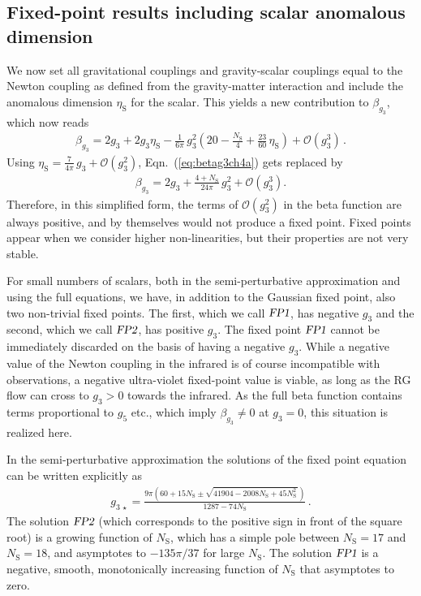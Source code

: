 \documentclass[11pt]{book}
\newcommand\etaS{ \eta_{\scriptscriptstyle{\mathrm{S}}} }
\newcommand\NS{ N_{\scriptscriptstyle{\mathrm{S}}} }
\newcommand{\FPone}  {\textsl{FP1}}
\newcommand{\FPtwo}  {\textsl{FP2}}
\numberwithin{equation}{chapter}
\begin{document}
\subsection{Fixed-point results including scalar anomalous dimension}
\label{FPwithmatterincludingetas}

We now set all gravitational couplings and gravity-scalar couplings equal to the Newton
coupling as defined from the gravity-matter interaction and include the anomalous dimension $\etaS$ for the scalar.
This yields a new contribution to $\beta_{g_3}$, which now reads
\begin{align}
  \beta_{g_3} = 2 g_3 + 2 g_3 \etaS - \frac{1}{6\pi} \, g_3^2
  \left( 20 - \frac{\NS}{4} + \frac{23}{60} \, \etaS \right)
  + \mathcal{O}(g_3^3) \,.
\end{align}
Using $\etaS = \frac{7}{4\pi} \, g_3 + \mathcal{O}(g_3^2)$, Eqn.~(\ref{eq:betag3ch4a}) gets replaced by
\begin{align}
  \beta_{g_3} = 2 g_3 +\frac{4+\NS}{24\pi} \, g_3^2 + \mathcal{O}(g_3^3).
  \label{eq:betag3ch4b}
\end{align}
Therefore, in this simplified form,
the terms of $\mathcal O(g_3^2)$ in the beta function
are always positive, and by themselves would
not produce a fixed point.
Fixed points appear when we consider higher non-linearities,
but their properties are not very stable.

For small numbers of scalars, both in the semi-perturbative
approximation and using the full equations, we have,
in addition to the Gaussian fixed point,
also two non-trivial fixed points.
The first, which we call $\FPone$, has
negative $g_3$ and the second, which we call $\FPtwo$,
has positive $g_3$.
The fixed point $\FPone$ cannot be immediately
discarded on the basis of having a negative $g_3$.
While a negative value of the Newton coupling in the infrared is of course incompatible with observations,
a negative ultra-violet fixed-point value is viable,
as long as the RG flow can cross to $g_3>0$ towards the infrared.
As the full beta function contains terms proportional to $g_5$ etc.,
which imply $\beta_{g_3}\neq0$ at $g_3=0$, this situation is realized here.

In the semi-perturbative approximation the solutions
of the fixed point equation can be written explicitly as
\begin{align}
  g_{3\,\star} = \frac{9 \pi \left( 60 + 15 \NS \pm \sqrt{41904-2008\NS+45\NS^2\,} \right)}{1287-74\NS} \,.
\end{align}
The solution $\FPtwo$ (which corresponds to the positive sign
in front of the square root) is a growing function of $\NS$, which has a simple pole
between $\NS=17$ and $\NS=18$, and asymptotes to $-135\pi/37$ for large $\NS$.
The solution $\FPone$ is a negative, smooth, monotonically increasing function
of $\NS$ that asymptotes to zero.
\end{document}
